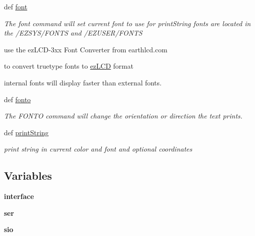 \begin{DoxyCompactItemize}
def \hyperlink{group___bitmap_font_gaf4cf49efa8ac77f85a27f2bafe6b80cf}{font}
\begin{DoxyCompactList}\small\item\em The font command will set current font to use for print\-String fonts are located in the /\-E\-Z\-S\-Y\-S/\-F\-O\-N\-T\-S and /\-E\-Z\-U\-S\-E\-R/\-F\-O\-N\-T\-S \par
 use the ez\-L\-C\-D-\/3xx Font Converter from earthlcd.\-com \par
 to convert truetype fonts to \hyperlink{classmodule_1_1ez_l_c_d3xx_1_1ez_l_c_d}{ez\-L\-C\-D} format \par
 internal fonts will display faster than external fonts. \end{DoxyCompactList}\item 
def \hyperlink{group___bitmap_font_ga9e4a0699fcde7bdd65fd97720b60b3d3}{fonto}
\begin{DoxyCompactList}\small\item\em The F\-O\-N\-T\-O command will change the orientation or direction the text prints. \end{DoxyCompactList}\item 
def \hyperlink{group___bitmap_font_ga9156f7c9f1239d24a3a8a7ade64291d8}{print\-String}
\begin{DoxyCompactList}\small\item\em print string in current color and font and optional coordinates \end{DoxyCompactList}\end{DoxyCompactItemize}
\subsection*{Variables}
\begin{DoxyCompactItemize}
\item 
\hypertarget{namespacemodule_1_1ez_l_c_d3xx_aefdffcc84055527bf80a32ebbd9afad4}{{\bfseries interface}}\label{d2/d2f/namespacemodule_1_1ez_l_c_d3xx_aefdffcc84055527bf80a32ebbd9afad4}

\item 
\hypertarget{namespacemodule_1_1ez_l_c_d3xx_a785e8de3bb811f4e30eb10935141ad28}{{\bfseries ser}}\label{d2/d2f/namespacemodule_1_1ez_l_c_d3xx_a785e8de3bb811f4e30eb10935141ad28}

\item 
\hypertarget{namespacemodule_1_1ez_l_c_d3xx_a7d638ed657ffbe9802056fc75a4d2379}{{\bfseries sio}}\label{d2/d2f/namespacemodule_1_1ez_l_c_d3xx_a7d638ed657ffbe9802056fc75a4d2379}

\end{DoxyCompactItemize}


